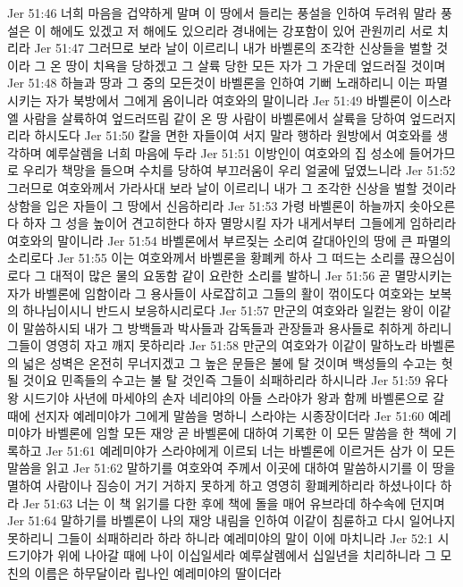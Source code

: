 Jer 51:46  너희 마음을 겁약하게 말며 이 땅에서 들리는 풍설을 인하여 두려워 말라 풍설은 이 해에도 있겠고 저 해에도 있으리라 경내에는 강포함이 있어 관원끼리 서로 치리라
Jer 51:47  그러므로 보라 날이 이르리니 내가 바벨론의 조각한 신상들을 벌할 것이라 그 온 땅이 치욕을 당하겠고 그 살륙 당한 모든 자가 그 가운데 엎드러질 것이며
Jer 51:48  하늘과 땅과 그 중의 모든것이 바벨론을 인하여 기뻐 노래하리니 이는 파멸시키는 자가 북방에서 그에게 옴이니라 여호와의 말이니라
Jer 51:49  바벨론이 이스라엘 사람을 살륙하여 엎드러뜨림 같이 온 땅 사람이 바벨론에서 살륙을 당하여 엎드러지리라 하시도다
Jer 51:50  칼을 면한 자들이여 서지 말라 행하라 원방에서 여호와를 생각하며 예루살렘을 너희 마음에 두라
Jer 51:51  이방인이 여호와의 집 성소에 들어가므로 우리가 책망을 들으며 수치를 당하여 부끄러움이 우리 얼굴에 덮였느니라
Jer 51:52  그러므로 여호와께서 가라사대 보라 날이 이르리니 내가 그 조각한 신상을 벌할 것이라 상함을 입은 자들이 그 땅에서 신음하리라
Jer 51:53  가령 바벨론이 하늘까지 솟아오른다 하자 그 성을 높이어 견고히한다 하자 멸망시킬 자가 내게서부터 그들에게 임하리라 여호와의 말이니라
Jer 51:54  바벨론에서 부르짖는 소리여 갈대아인의 땅에 큰 파멸의 소리로다
Jer 51:55  이는 여호와께서 바벨론을 황폐케 하사 그 떠드는 소리를 끊으심이로다 그 대적이 많은 물의 요동함 같이 요란한 소리를 발하니
Jer 51:56  곧 멸망시키는 자가 바벨론에 임함이라 그 용사들이 사로잡히고 그들의 활이 꺾이도다 여호와는 보복의 하나님이시니 반드시 보응하시리로다
Jer 51:57  만군의 여호와라 일컫는 왕이 이같이 말씀하시되 내가 그 방백들과 박사들과 감독들과 관장들과 용사들로 취하게 하리니 그들이 영영히 자고 깨지 못하리라
Jer 51:58  만군의 여호와가 이같이 말하노라 바벨론의 넓은 성벽은 온전히 무너지겠고 그 높은 문들은 불에 탈 것이며 백성들의 수고는 헛 될 것이요 민족들의 수고는 불 탈 것인즉 그들이 쇠패하리라 하시니라
Jer 51:59  유다 왕 시드기야 사년에 마세야의 손자 네리야의 아들 스라야가 왕과 함께 바벨론으로 갈 때에 선지자 예레미야가 그에게 말씀을 명하니 스라야는 시종장이더라
Jer 51:60  예레미야가 바벨론에 임할 모든 재앙 곧 바벨론에 대하여 기록한 이 모든 말씀을 한 책에 기록하고
Jer 51:61  예레미야가 스라야에게 이르되 너는 바벨론에 이르거든 삼가 이 모든 말씀을 읽고
Jer 51:62  말하기를 여호와여 주께서 이곳에 대하여 말씀하시기를 이 땅을 멸하여 사람이나 짐승이 거기 거하지 못하게 하고 영영히 황폐케하리라 하셨나이다 하라
Jer 51:63  너는 이 책 읽기를 다한 후에 책에 돌을 매어 유브라데 하수속에 던지며
Jer 51:64  말하기를 바벨론이 나의 재앙 내림을 인하여 이같이 침륜하고 다시 일어나지 못하리니 그들이 쇠패하리라 하라 하니라 예레미야의 말이 이에 마치니라
Jer 52:1  시드기야가 위에 나아갈 때에 나이 이십일세라 예루살렘에서 십일년을 치리하니라 그 모친의 이름은 하무달이라 립나인 예레미야의 딸이더라

